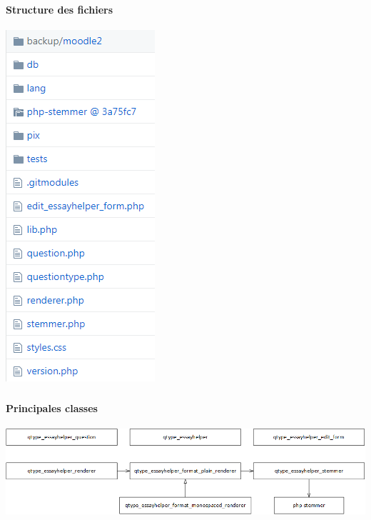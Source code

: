 \documentclass{beamer}
\begin{document}
  \begin{frame}
  \frametitle{\insertsection}
  \framesubtitle{Structure des fichiers}
  \begin{center}
    \includegraphics[scale=0.5]{../images/architecture.png}
  \end{center}
  \end{frame}
  
  \begin{frame}
  \frametitle{\insertsection}
  \framesubtitle{Principales classes}
  \begin{center}
    \includegraphics[scale=0.4]{../images/class-simple.png}
  \end{center}
  \end{frame}
  
\end{document}

